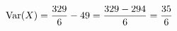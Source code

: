 \documentclass[preview]{standalone}
\begin{document}
\begin{align*}
\special{dvisvgm:raw <g id='unique000'>}\operatorname{Var}(X)=\dfrac{329}{6}-49=\dfrac{329-294}{6}=\dfrac{35}{6}\special{dvisvgm:raw </g>}
\end{align*}
\end{document}
